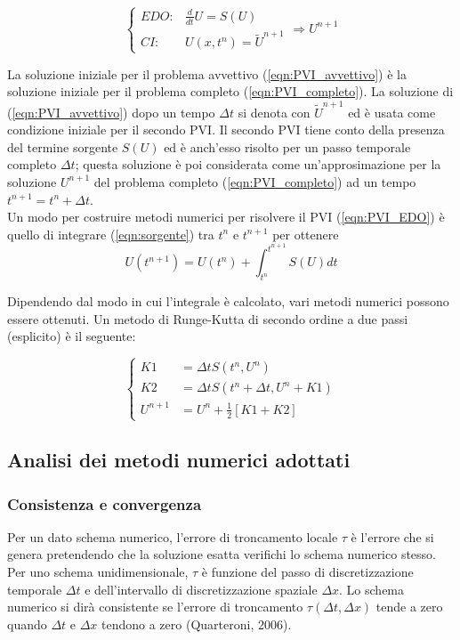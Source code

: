 \documentclass[12pt]{article} %
\begin{document}
\begin{equation}
    \left\{\begin{array}{lr}
        EDO: & \frac{d}{dt}U = S(U)\\
        CI: & U(x,t^n)=\tilde{U}^{n+1}
        \end{array}
    \right. \Longrightarrow U^{n+1}
    \label{eqn:PVI_EDO}
\end{equation}

\noindent La soluzione iniziale per il problema avvettivo (\ref{eqn:PVI_avvettivo}) è la soluzione iniziale per il problema completo (\ref{eqn:PVI_completo}). La soluzione di (\ref{eqn:PVI_avvettivo}) dopo un tempo $\Delta t$ si denota con $\tilde{U}^{n+1}$ ed è usata come condizione iniziale per il secondo PVI. Il secondo PVI tiene conto della presenza del termine sorgente $S(U)$ ed è anch'esso risolto per un passo temporale completo $\Delta t$; questa soluzione è poi considerata come un'approsimazione per la soluzione $U^{n+1}$ del problema completo (\ref{eqn:PVI_completo}) ad un tempo $t^{n+1}=t^n+\Delta t$.\\
Un modo per costruire metodi numerici per risolvere il PVI (\ref{eqn:PVI_EDO}) è quello di integrare (\ref{eqn:sorgente}) tra $t^n$ e $t^{n+1}$ per ottenere
\begin{equation}
    U(t^{n+1}) = U(t^n) + \int_{t^n}^{t^{n+1}}S(U)dt
\end{equation}

\noindent Dipendendo dal modo in cui l'integrale è calcolato, vari metodi numerici possono essere ottenuti. Un metodo di Runge-Kutta di secondo ordine a due passi (esplicito) è il seguente:

\begin{equation}
    \left\{\begin{array}{ll}
        K1 &= \Delta tS(t^n,U^n)\\
        K2 &= \Delta tS(t^n+\Delta t, U^n+K1)\\
        U^{n+1} &= U^n + \frac{1}{2}[K1+K2]
         \end{array}
    \right.
    \label{eqn:Runge-Kutta}
\end{equation}

\subsection{Analisi dei metodi numerici adottati}
\subsubsection{Consistenza e convergenza}
\noindent Per un dato schema numerico, l'errore di troncamento locale $\tau$ è l'errore che si genera pretendendo che la soluzione esatta verifichi lo schema numerico stesso.
Per uno schema unidimensionale, $\tau$ è  funzione del passo di discretizzazione temporale $\Delta t$ e  dell'intervallo di discretizzazione spaziale $\Delta x$. Lo schema numerico si dirà consistente se l'errore di troncamento $\tau(\Delta t, \Delta x)$ tende a zero quando $\Delta t$ e $\Delta x$ tendono a zero (Quarteroni, 2006).
\end{document}
